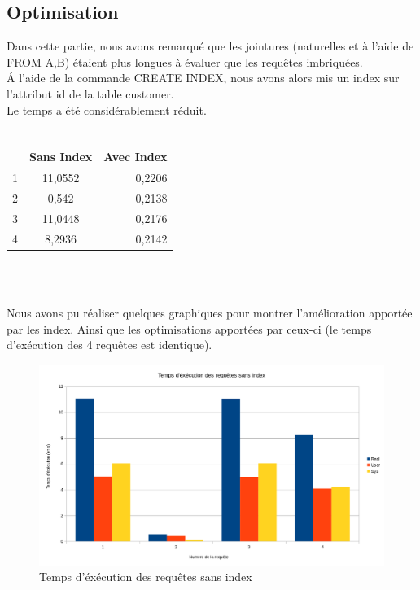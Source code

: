 \documentclass{article}
\begin{document}
\subsection{Optimisation}
Dans cette partie, nous avons remarqu\'e que les jointures (naturelles et \`a l'aide de FROM A,B) \'etaient plus longues \`a \'evaluer que les requ\^etes imbriqu\'ees.\\
\'A l'aide de la commande CREATE INDEX, nous avons alors mis un index sur l'attribut id de la table customer.\\
Le temps a \'et\'e consid\'erablement r\'eduit.\\\\
\begin{center}
\begin{tabular}{|l|c|r|}
  \hline
   & Sans Index & Avec Index \\
  \hline
  1 & 11,0552 & 0,2206 \\
  \hline
  2 & 0,542 & 0,2138 \\
  \hline
  3 & 11,0448 & 0,2176 \\
  \hline
  4 & 8,2936 & 0,2142 \\
  \hline
\end{tabular}\\
\end{center}\\
Nous avons pu r\'ealiser quelques graphiques pour montrer l'am\'elioration apport\'ee par les index. Ainsi que les optimisations apport\'ees par ceux-ci (le temps d'ex\'ecution des 4 requ\^etes est identique).\\
\begin{figure}
	\begin{center}
		\includegraphics[scale=0.55]{images/rsi}\\
		Temps d'\'ex\'ecution des requ\^etes sans index
	\end{center}
\end{figure}
\end{document}
